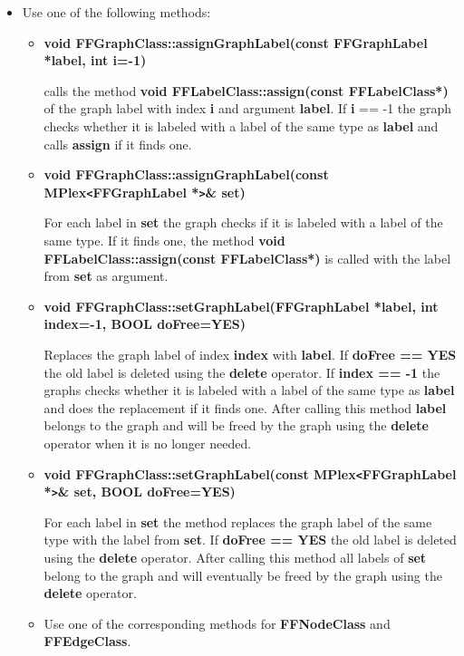 \begin{itemize}

\item
Use one of the following methods:

\begin{itemize}
  
\item{\bf void FFGraphClass::assignGraphLabel(const FFGraphLabel
    *label, int i=-1)}

calls the method {\bf void FFLabelClass::assign(const
  FFLabelClass*)} of the graph label with index {\bf i} and
argument {\bf label}. If {\bf i} == -1 the graph checks whether it is
labeled with a label of the same type as {\bf label} and calls
{\bf assign} if it finds one.

\item{\bf void FFGraphClass::assignGraphLabel(const
MPlex\verb|<|FFGraphLabel *\verb|>|\& set)}
        
For each label in {\bf set} the graph checks if it is labeled
with a label of the same type. If it finds one, the method {\bf void
  FFLabelClass::assign(const FFLabelClass*)} is called
with the label from {\bf set} as argument.

\item{\bf void FFGraphClass::setGraphLabel(FFGraphLabel *label,
    int index=-1, BOOL doFree=YES)}
  
  Replaces the graph label of index {\bf index} with {\bf label}.  If
  {\bf doFree == YES} the old label is deleted using the {\bf delete}
  operator.  If {\bf index == -1} the graphs checks whether it is
  labeled with a label of the same type as {\bf label} and does the
  replacement if it finds one. After calling this method {\bf label}
  belongs to the graph and will be freed by the graph using the {\bf
    delete} operator when it is no longer needed.

\item{\bf void FFGraphClass::setGraphLabel(const
    MPlex\verb|<|FFGraphLabel *\verb|>|\& set, BOOL doFree=YES)}

For each label in {\bf set} the method replaces the graph label
of the same type with the label from {\bf set}. If {\bf doFree ==
  YES} the old label is deleted using the {\bf delete} operator.
After calling this method all labels of {\bf set} belong to the
graph and will eventually be freed by the graph using the {\bf
  delete} operator.

\item Use one of the corresponding methods for {\bf FFNodeClass} and
  {\bf FFEdgeClass}.

\end{itemize}

\end{itemize}

